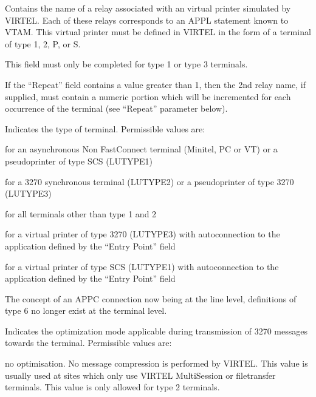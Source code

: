 \documentclass[letterpaper,10pt,english]{sphinxmanual}
\begin{document}
\begin{description}
\sphinxAtStartPar
Contains the name of a relay associated with an virtual printer simulated by VIRTEL. Each of these relays corresponds to an APPL statement known to VTAM. This virtual printer must be defined in VIRTEL in the form of a terminal of type
1, 2, P, or S.

\sphinxAtStartPar
This field must only be completed for type 1 or type 3 terminals.

\sphinxAtStartPar
If the “Repeat” field contains a value greater than 1, then the 2nd relay name, if supplied, must contain a numeric portion which will be incremented for each occurrence of the terminal (see “Repeat” parameter below).

\sphinxAtStartPar
Indicates the type of terminal. Permissible values are:
\begin{description}
\sphinxAtStartPar
for an asynchronous Non Fast\sphinxhyphen{}Connect terminal (Minitel, PC or VT) or a pseudo\sphinxhyphen{}printer of type SCS (LUTYPE1)

\sphinxAtStartPar
for a 3270 synchronous terminal (LUTYPE2) or a pseudo\sphinxhyphen{}printer of type 3270 (LUTYPE3)

\sphinxAtStartPar
for all terminals other than type 1 and 2

\sphinxAtStartPar
for a virtual printer of type 3270 (LUTYPE3) with auto\sphinxhyphen{}connection to the application defined by the “Entry Point” field

\sphinxAtStartPar
for a virtual printer of type SCS (LUTYPE1) with auto\sphinxhyphen{}connection to the application defined by the “Entry Point” field

\end{description}

\sphinxAtStartPar
The concept of an APPC connection now being at the line level, definitions of type 6 no longer exist at the terminal
level.

\sphinxAtStartPar
Indicates the optimization mode applicable during transmission of 3270 messages towards the terminal. Permissible values are:
\begin{description}
\sphinxAtStartPar
no optimisation.
No message compression is performed by VIRTEL. This value is usually used at sites which only use VIRTEL Multi\sphinxhyphen{}Session or file\sphinxhyphen{}transfer terminals. This value is only allowed for type 2 terminals.


\end{description}
\end{description}
\end{document}
